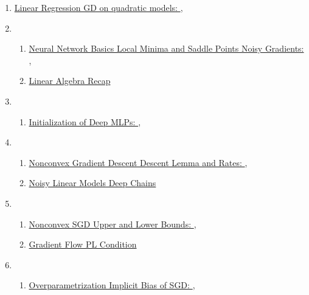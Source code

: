 \documentclass[11pt]{article}
\begin{document}
\begin{enumerate}
	\item  \href{https://mp.weixin.qq.com/s/Nm15Bvq1UFck9pu6PBze9Q}{Linear Regression GD on quadratic models: },\quad  \href{https://mp.weixin.qq.com/s/ng2rwFauVWaiUZcm_quyZQ}{} %
	\item  %
	\begin{enumerate}
		\item  \href{https://mp.weixin.qq.com/s/e2lu0_CoJSobPFBC1Eqw-w}{Neural Network Basics Local Minima and Saddle Points Noisy Gradients: },\quad  \href{https://mp.weixin.qq.com/s/beHsqBW6m8wqj-Q-tqsBHw}{}	%
		\item \href{https://mp.weixin.qq.com/s/4qu2jWGpM9OstznYOvtHTw}{Linear Algebra Recap}	%
	\end{enumerate}
	\item  %
	\begin{enumerate}
		\item \href{https://mp.weixin.qq.com/s/zKrfhVvSeiDHNNF8FOHuVw}{Initialization of Deep MLPs: },\quad \href{https://mp.weixin.qq.com/s/2ITNH-wwlAx-zAr9-WrU_A}{}	%
	\end{enumerate}
	\item  %
	\begin{enumerate}
		\item  \href{https://mp.weixin.qq.com/s/KBLW1P0WhqSnTMSY6as_zw}{Nonconvex Gradient Descent Descent Lemma and Rates: },\quad \href{https://mp.weixin.qq.com/s/lWmRvUNaSC0SSadPl9KpeA}{}  %
		\item \href{https://mp.weixin.qq.com/s/VsFcJATlqDcg52XI9fkeNg}{Noisy Linear Models Deep Chains} %
	\end{enumerate}
	\item  %
	\begin{enumerate}
		\item  \href{https://mp.weixin.qq.com/s/lrsJ7UtepSBTTjsjtVGbkg}{Nonconvex SGD Upper and Lower Bounds: },\quad \href{https://mp.weixin.qq.com/s/3Xt0ZckiRZcayyBtoZQzBA}{} %
		\item \href{https://mp.weixin.qq.com/s/dzXiLWImnEndnOZpuA3xsQ}{Gradient Flow PL Condition} %
	\end{enumerate}
	\item  %
	\begin{enumerate}
		\item  \href{https://mp.weixin.qq.com/s/B5CseyR8oEAxleu1VbgpSg}{Overparametrization Implicit Bias of SGD: },\quad \href{https://mp.weixin.qq.com/s/HpHSQo0RcyXXmrOWhIhTAw}{} %

\end{enumerate}
\end{enumerate}
\end{document}
